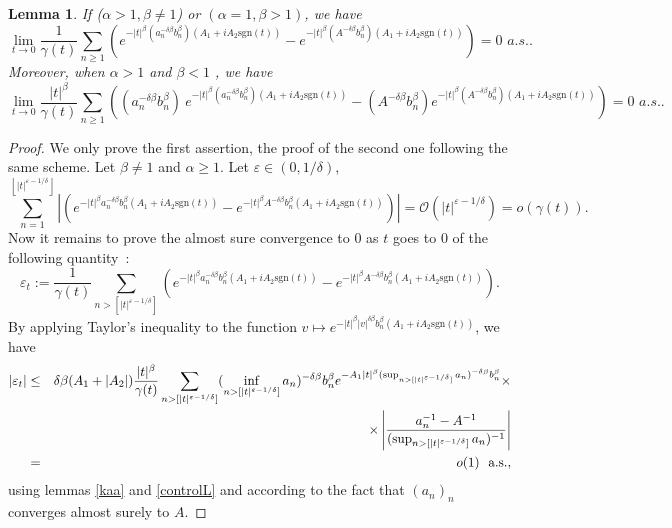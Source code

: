 \documentclass[oneside, a4paper,11pt,reqno]{amsart}
\newtheorem{lem}[hypo]{Lemma}
\begin{document}
\begin{lem}\label{cvps}
If ($\alpha> 1,\beta\ne 1$) or $(\alpha=1,\beta >1)$,  we have
$$\lim_{t\rightarrow 0}\frac 1{\gamma(t)}
  \sum_{n\ge 1} \left(e^{-|t|^\beta(a_n^{-\delta\beta}b_n^\beta) 
  (A_1+iA_2 \text{sgn} (t))}-
   e^{-|t|^\beta(A^{-\delta\beta} b_n^{\beta})
   ( A_1+i A_2 \text{sgn} (t))  }\right)=0\, \, a.s..$$
Moreover, when $\alpha >1$ and $\beta <1$ , we have 
   $$\lim_{t\rightarrow 0} \frac{|t|^{\beta} } {\gamma(t)}
  \sum_{n\ge 1} \left( (a_n^{-\delta\beta}b_n^\beta)\ e^{-|t|^\beta(a_n^{-\delta\beta}b_n^\beta) 
  (A_1+iA_2 \text{sgn} (t))}- (A^{-\delta\beta} b_n^\beta)    e^{-|t|^\beta(A^{-\delta\beta} b_n^{\beta})
   ( A_1+i A_2 \text{sgn} (t))  }\right)=0\, \, a.s..$$
\end{lem}
\begin{proof}
We only prove the first assertion, the proof of the second one following the same scheme. Let $\beta\neq 1$ and $\alpha\geq 1$. 
Let $\varepsilon \in (0, 1/\delta)$,
$$\sum_{n=1}^{{\left\lfloor {{|t|^{\varepsilon-1/\delta}}} \right\rfloor} } 
  \left|\left(e^{-|t|^\beta a_n^{-\delta\beta}b_n^\beta(A_1+ i A_2 \text{sgn} (t))} -
 e^{-|t|^\beta A^{-\delta\beta} b_n^\beta  (A_1+ i A_2\text{sgn} (t))}\right)\right|
  =\mathcal{O}(|t|^{\varepsilon-1/\delta}) ={o}(\gamma(t)).$$ 
Now it remains to prove 
the almost sure convergence to 0 as $t$ goes to $0$ of the following quantity~:
 $$\varepsilon_t:= \frac 1{\gamma(t)}    \sum_{ n > [|t|^{\varepsilon-1/\delta}] } 
   \left(e^{-|t|^\beta a_n^{-\delta\beta} b_n^{\beta}(A_1+iA_2\text{sgn} (t))}-
 e^{-|t|^\beta A^{-\delta\beta} b_n^{\beta}(A_1+iA_2\text{sgn} (t) )}\right).$$ 
By applying Taylor's inequality to the function 
$v\mapsto e^{-|t|^\beta|v|^{\delta\beta} b_n^\beta(A_1+iA_2\text{sgn}(t))}$,  
we have
 \begin{eqnarray*}
|\varepsilon_t|
&\leq &\delta\beta (A_1+|A_2|) \frac{ |t|^\beta}{\gamma(t)}  
\sum_{ n > [|t|^{\varepsilon-1/\delta}] }   (\inf_{n>[|t|^{\varepsilon-1/\delta}]}
      a_n)^{-\delta\beta} b_n ^\beta  e^{-A_1 |t|^\beta (\sup_{n>[|t|^{\varepsilon-1/\delta}]}
  a_n)^{-\delta\beta} b_n^\beta } \times\\
&\, &\ \ \ \ \ \ \ \ \ \ \ \ \ \ \ \ \ \ 
\ \ \ \ \ \ \ \ \ \ \ \ \ \ \ \ \ \ 
  \times \left|\frac{a_n^{-1}-A^{-1}} {(\sup_{n>[|t|^{\varepsilon-1/\delta}]} a_n)^{-1}}\right|\\ 
 &=&o(1) \ \ \mbox{\rm a.s.},
\end{eqnarray*} 
using lemmas \ref{kaa} and \ref{controlL} and
according to the fact that $(a_n)_n$ converges almost surely to $A$.
\end{proof}
\end{document}
